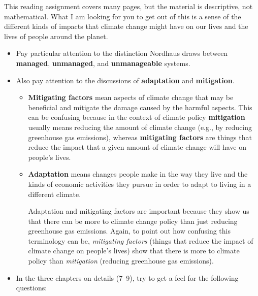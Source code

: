 \documentclass[
]{article}
\begin{document}
This reading assignment covers many pages, but the material is
descriptive, not mathematical. What I am looking for you to get out of
this is a sense of the different kinds of impacts that climate change
might have on our lives and the lives of people around the planet.

\begin{itemize}
\item
  Pay particular attention to the distinction Nordhaus draws between
  \textbf{managed}, \textbf{unmanaged}, and \textbf{unmanageable}
  systems.
\item
  Also pay attention to the discussions of \textbf{adaptation} and
  \textbf{mitigation}.

  \begin{itemize}
  \item
    \textbf{Mitigating factors} mean aspects of climate change that may
    be beneficial and mitigate the damage caused by the harmful aspects.
    This can be confusing because in the context of climate policy
    \textbf{mitigation} usually means reducing the amount of climate
    change (e.g., by reducing greenhouse gas emissions), whereas
    \textbf{mitigating factors} are things that reduce the impact that a
    given amount of climate change will have on people's lives.
  \item
    \textbf{Adaptation} means changes people make in the way they live
    and the kinds of economic activities they pursue in order to adapt
    to living in a different climate.

    Adaptation and mitigating factors are important because they show us
    that there can be more to climate change policy than just reducing
    greenhouse gas emissions. Again, to point out how confusing this
    terminology can be, \emph{mitigating factors} (things that reduce
    the impact of climate change on people's lives) show that there is
    more to climate policy than \emph{mitigation} (reducing greenhouse
    gas emissions).
  \end{itemize}
\item
  In the three chapters on details (7--9), try to get a feel for the
  following questions:


\end{itemize}
\end{document}
